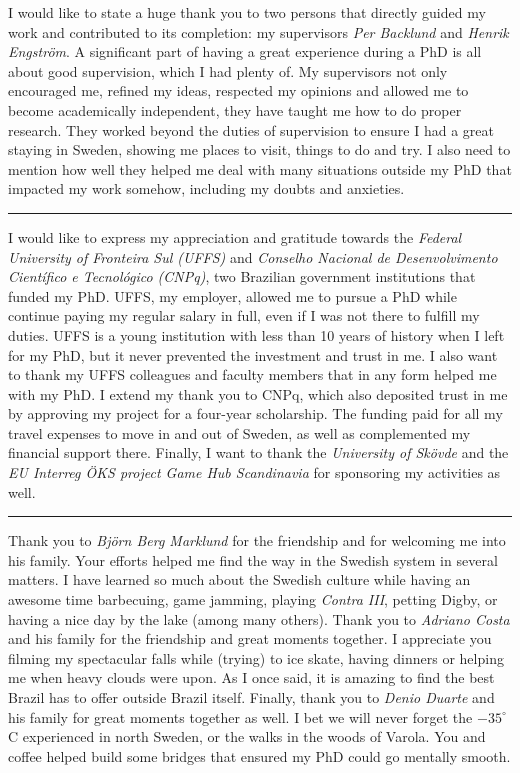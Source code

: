 I would like to state a huge thank you to two persons that directly guided my work and contributed to its completion: my supervisors \textit{Per Backlund} and \textit{Henrik Engstr{\"o}m}. A significant part of having a great experience during a PhD is all about good supervision, which I had plenty of. My supervisors not only encouraged me, refined my ideas, respected my opinions and allowed me to become academically independent, they have taught me how to do proper research. They worked beyond the duties of supervision to ensure I had a great staying in Sweden, showing me places to visit, things to do and try. I also need to mention how well they helped me deal with many situations outside my PhD that impacted my work somehow, including my doubts and anxieties.

\vspace{7pt}\hrule\vspace{5pt}

I would like to express my appreciation and gratitude towards the \textit{Federal University of Fronteira Sul (UFFS)} and \textit{Conselho Nacional de Desenvolvimento Cient\'{i}fico e Tecnol\'{o}gico (CNPq)}, two Brazilian government institutions that funded my PhD. UFFS, my employer, allowed me to pursue a PhD while continue paying my regular salary in full, even if I was not there to fulfill my duties. UFFS is a young institution with less than 10 years of history when I left for my PhD, but it never prevented the investment and trust in me. I also want to thank my UFFS colleagues and faculty members that in any form helped me with my PhD. I extend my thank you to CNPq, which also deposited trust in me by approving my project for a four-year scholarship. The funding paid for all my travel expenses to move in and out of Sweden, as well as complemented my financial support there. Finally, I want to thank the \textit{University of Sk\"ovde} and the \textit{EU Interreg \"OKS project Game Hub Scandinavia} for sponsoring my activities as well.

\vspace{7pt}\hrule\vspace{5pt}

Thank you to \textit{Bj{\"o}rn Berg Marklund} for the friendship and for welcoming me into his family. Your efforts helped me find the way in the Swedish system in several matters. I have learned so much about the Swedish culture while having an awesome time barbecuing, game jamming, playing \textit{Contra III}, petting Digby, or having a nice day by the lake (among many others). Thank you to \textit{Adriano Costa} and his family for the friendship and great moments together. I appreciate you filming my spectacular falls while (trying) to ice skate, having dinners or helping me when heavy clouds were upon. As I once said, it is amazing to find the best Brazil has to offer outside Brazil itself. Finally, thank you to \textit{Denio Duarte} and his family for great moments together as well. I bet we will never forget the $-35^{\circ}$C experienced in north Sweden, or the walks in the woods of Varola. You and coffee helped build some bridges that ensured my PhD could go mentally smooth.

